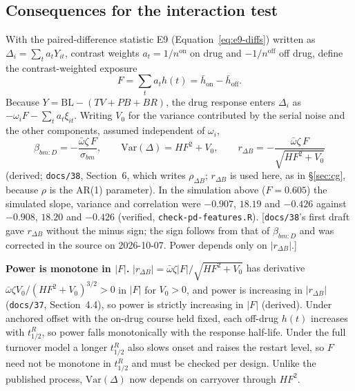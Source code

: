 \documentclass[11pt]{article}
\newcommand{\note}[1]{\textcolor{blue!60!black}{\small [#1]}}
\newcommand{\code}[1]{\texttt{#1}}
\begin{document}
\subsection{Consequences for the interaction test}

With the paired-difference statistic E9 (Equation~\eqref{eq:e9-diffs})
written as $\Delta_i = \sum_t a_t Y_{it}$, contrast weights
$a_t = 1/n^{\text{on}}$ on drug and $-1/n^{\text{off}}$ off drug,
define the contrast-weighted exposure
\begin{equation}
F = \sum_t a_t h(t) = \bar h_{\text{on}} - \bar h_{\text{off}} .
\label{eq:pd-F}
\end{equation}
Because $Y = \mathrm{BL} - (TV + PB + BR)$, the drug response enters
$\Delta_i$ as $-\omega_i F - \sum_t a_t \xi_{it}$. Writing $V_0$ for
the variance contributed by the serial noise and the other components,
assumed independent of $\omega_i$,
\begin{equation}
\beta_{bm:D} = -\frac{\bar\omega\zeta\, F}{\sigma_{bm}}, \qquad
\mathrm{Var}(\Delta) = H F^2 + V_0, \qquad
r_{\Delta B} = -\frac{\bar\omega\zeta\, F}{\sqrt{H F^2 + V_0}}
\label{eq:pd-slope}
\end{equation}
(derived; \code{docs/38}, Section~6, which writes $\rho_{\Delta B}$;
$r_{\Delta B}$ is used here, as in \S\ref{sec:cg}, because $\rho$ is
the AR(1) parameter). In the simulation above
($F = 0.605$) the simulated slope, variance and correlation were
$-0.907$, $18.19$ and $-0.426$ against $-0.908$, $18.20$ and $-0.426$
(verified, \code{check-pd-features.R}). \note{\code{docs/38}'s first draft
gave $r_{\Delta B}$ without the minus sign; the sign follows from
that of $\beta_{bm:D}$ and was corrected in the source on 2026-10-07.
Power depends only on $|r_{\Delta B}|$.}

\textbf{Power is monotone in $|F|$.} $|r_{\Delta B}| =
\bar\omega\zeta|F|/\sqrt{HF^2 + V_0}$ has derivative
$\bar\omega\zeta V_0/(HF^2 + V_0)^{3/2} > 0$ in $|F|$ for $V_0 > 0$,
and power is increasing in $|r_{\Delta B}|$ (\code{docs/37},
Section~4.4), so power is strictly increasing in $|F|$ (derived).
Under anchored offset with the on-drug course held fixed, each
off-drug $h(t)$ increases with $t_{1/2}^{R}$, so power falls
monotonically with the response half-life. Under the full turnover
model a longer $t_{1/2}^{R}$ also slows onset and raises the restart
level, so $F$ need not be monotone in $t_{1/2}^{R}$ and must be
checked per design. Unlike the published process, $\mathrm{Var}
(\Delta)$ now depends on carryover through $HF^2$.
\end{document}
